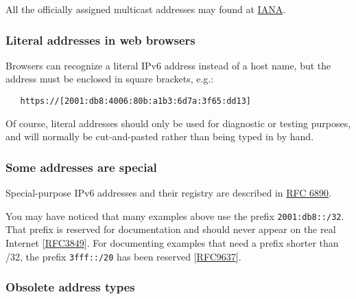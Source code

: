 \documentclass[
]{article}
\begin{document}
All the officially assigned multicast addresses may found at
\href{https://www.iana.org/assignments/ipv6-multicast-addresses/ipv6-multicast-addresses.xhtml\#link-local}{IANA}.

\subsubsection{Literal addresses in web
browsers}\label{literal-addresses-in-web-browsers}

Browsers can recognize a literal IPv6 address instead of a host name,
but the address must be enclosed in square brackets, e.g.:

\begin{verbatim}
   https://[2001:db8:4006:80b:a1b3:6d7a:3f65:dd13]
\end{verbatim}

Of course, literal addresses should only be used for diagnostic or
testing purposes, and will normally be cut-and-pasted rather than being
typed in by hand.

\subsubsection{Some addresses are
special}\label{some-addresses-are-special}

Special-purpose IPv6 addresses and their registry are described in
\href{https://www.rfc-editor.org/info/rfc6890}{RFC 6890}.

You may have noticed that many examples above use the prefix
\texttt{2001:db8::/32}. That prefix is reserved for documentation and
should never appear on the real Internet
{[}\href{https://www.rfc-editor.org/info/rfc3849}{RFC3849}{]}. For
documenting examples that need a prefix shorter than /32, the prefix
\texttt{3fff::/20} has been reserved
{[}\href{https://www.rfc-editor.org/info/rfc9637}{RFC9637}{]}.

\subsubsection{Obsolete address types}\label{obsolete-address-types}
\end{document}
